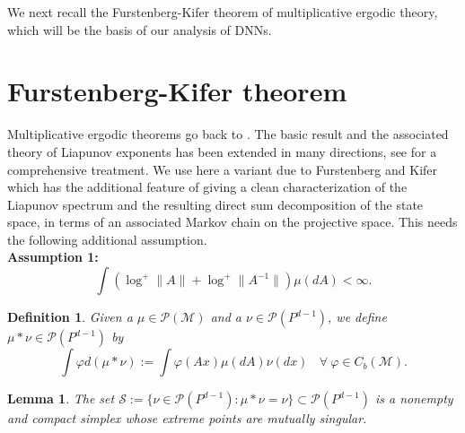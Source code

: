 \documentclass[10pt,a4paper]{amsart}
\newtheorem{lemma}[theorem]{Lemma}
\newtheorem{definition}[theorem]{Definition}
\newcommand{\M}{\mathcal{M}}
\newcommand{\PA}{\mathcal{P}}
\newcommand{\SA}{\mathcal{S}}
\newcommand{\0}{\textbf{0}}
\begin{document}
\medskip

We next recall the Furstenberg-Kifer theorem of multiplicative ergodic theory, which will be the basis of our analysis of DNNs.


\section{Furstenberg-Kifer theorem}\label{main}

Multiplicative ergodic theorems go back to \cite{Osel}. The basic result and the associated theory of Liapunov exponents has been extended in many directions, see \cite{Arnold} for a comprehensive treatment. We use here a variant due to Furstenberg and Kifer \cite{FK} which has the additional feature of giving a clean characterization of the Liapunov spectrum and the resulting direct sum decomposition of the state space, in terms of an associated Markov chain on the projective space. This needs the following additional assumption.\\

\noindent \textbf{Assumption 1:}\label{Ass} $$\int\left(\log^+\|A\| + \log^+\|A^{-1}\|\right)\mu(dA) < \infty.$$

\medskip


%

\begin{definition}\label{MKernel} Given a $\mu \in \PA(\M)$ and a $\nu \in \PA(P^{d-1})$, we define $\mu*\nu \in \PA(P^{d-1})$ by
\begin{equation}
\int \varphi d(\mu*\nu) := \int \varphi(Ax)\mu(dA)\nu(dx) \ \ \ \ \forall \ \varphi \in C_b(\M). \label{star}
\end{equation}
\end{definition}

\medskip

\begin{lemma}\label{extreme} The set $\SA := \{\nu \in \PA(P^{d-1}) : \mu*\nu = \nu\} \subset \PA(P^{d-1})$ is a nonempty  and compact simplex whose extreme points are mutually singular. \end{lemma}
\end{document}
